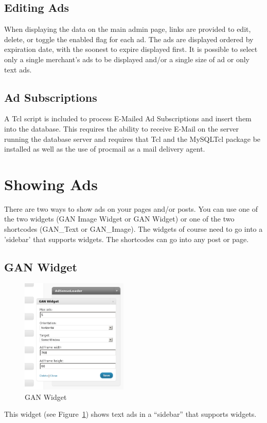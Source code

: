\documentclass[letterpaper]{article}
\begin{document}
\subsection{Editing Ads}

When displaying the data on the main admin page, links are provided
to edit, delete, or toggle the enabled flag for each ad. The ads are
displayed ordered by expiration date, with the soonest to expire
displayed first. It is possible to select only a single merchant's ads
to be displayed and/or a single size of ad or only text ads.

\subsection{Ad Subscriptions}

A Tcl script is included to process E-Mailed Ad Subscriptions and
insert them into the database.  This requires the ability to receive
E-Mail on the server running the database server and requires that Tcl
and the MySQLTcl package be installed as well as the use of procmail as
a mail delivery agent.

\section{Showing Ads}

There are two ways to show ads on your pages and/or posts.  You can
use one of the two widgets (GAN Image Widget or GAN Widget) or one of
the two shortcodes (GAN\_Text or GAN\_Image).  The widgets of course need
to go into a 'sidebar' that supports widgets.  The shortcodes can go
into any post or page.

\subsection{GAN Widget}

\begin{figure}[ht]
\begin{centering}
\includegraphics[width=2in]{ganwidget.png}
\caption{GAN Widget}
\label{fig:ganwidget}
\end{centering}
\end{figure}
This widget (see Figure~\ref{fig:ganwidget}) shows text ads in a
``sidebar'' that supports widgets.
\end{document}
